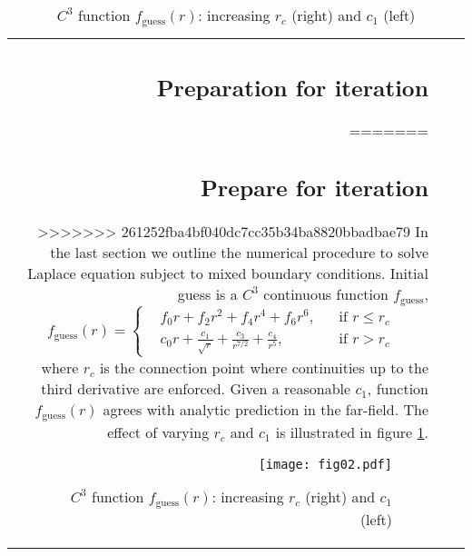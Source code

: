 \documentclass{jfm}
\begin{document}
\begin{table}
\begin{center}
\begin{tabular}{rl|l}
\subsection{Preparation for iteration}
=======
\subsection{Prepare for iteration}
>>>>>>> 261252fba4bf040dc7cc35b34ba8820bbadbae79
In the last section we outline the numerical procedure to solve Laplace equation subject to mixed boundary conditions.
Initial guess is a $C^3$ continuous function $f_\mathrm{guess}$,
\begin{equation}
f_\mathrm{guess}(r)=\left\{\begin{aligned}
&f_0r+f_2r^2+f_4r^4+f_6r^6,&&\textrm{if }r\le r_c\\
&c_0 r + \frac{c_1}{\sqrt{r}} +\frac{c_3}{r^{7/2}}+\frac{c_4}{r^{5}},&&\textrm{if }r>r_c
\end{aligned}\right.
\end{equation}
where $r_c$ is the connection point where continuities up to the third derivative are enforced.
Given a reasonable $c_1$, function $f_\mathrm{guess}(r)$ agrees with analytic prediction in the far-field.
The effect of varying $r_c$ and $c_1$ is illustrated in figure \ref{fig:initialGuess}.
\begin{figure}
  \centering
  \texttt{[image: fig02.pdf]}%
  \caption{$C^3$ function $f_\mathrm{guess}(r)$: increasing $r_c$ (right) and $c_1$ (left)  }
\label{fig:initialGuess}
\end{figure}



\end{tabular}
\end{center}
\end{table}
\end{document}
